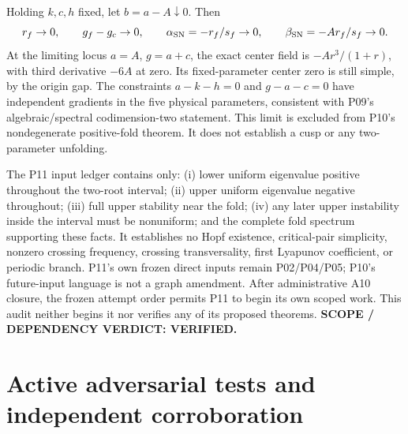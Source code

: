 \documentclass[11pt]{article}
\begin{document}
Holding $k,c,h$ fixed, let $b=a-A\downarrow0$. Then
\[
 r_f\to0,\qquad g_f-g_c\to0,\qquad
 \alpha_{\rm SN}=-r_f/s_f\to0,\qquad
 \beta_{\rm SN}=-Ar_f/s_f\to0.
\]
At the limiting locus $a=A$, $g=a+c$, the exact center field is
$-Ar^3/(1+r)$, with third derivative $-6A$ at zero. Its fixed-parameter
center zero is still simple, by the origin gap. The constraints $a-k-h=0$
and $g-a-c=0$ have independent gradients in the five physical parameters,
consistent with P09's algebraic/spectral codimension-two statement. This
limit is excluded from P10's nondegenerate positive-fold theorem. It does
not establish a cusp or any two-parameter unfolding.

The P11 input ledger contains only: (i) lower uniform eigenvalue positive
throughout the two-root interval; (ii) upper uniform eigenvalue negative
throughout; (iii) full upper stability near the fold; (iv) any later upper
instability inside the interval must be nonuniform; and the complete fold
spectrum supporting these facts. It establishes no Hopf existence,
critical-pair simplicity, nonzero crossing frequency, crossing transversality,
first Lyapunov coefficient, or periodic branch. P11's own frozen direct inputs
remain P02/P04/P05; P10's future-input language is not a graph amendment.
After administrative A10 closure, the frozen attempt order permits P11 to
begin its own scoped work. This audit neither begins it nor verifies any of
its proposed theorems. \textbf{SCOPE / DEPENDENCY VERDICT: VERIFIED.}

\section{Active adversarial tests and independent corroboration}
\label{sec:checks}
\end{document}

